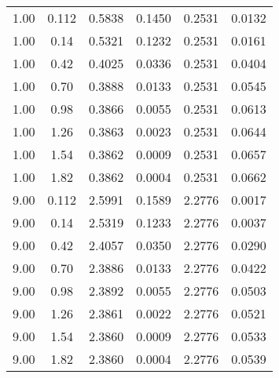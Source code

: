 \documentclass{article}[11pt]
\begin{document}
\begin{table}[h]
\begin{tabular}{cc|cccc}
1.00 & 0.112 & 0.5838 & 0.1450 & 0.2531 & 0.0132 \\
1.00 & 0.14 & 0.5321 & 0.1232 & 0.2531 & 0.0161 \\
1.00 & 0.42 & 0.4025 & 0.0336 & 0.2531 & 0.0404 \\
1.00 & 0.70 & 0.3888 & 0.0133 & 0.2531 & 0.0545 \\
1.00 & 0.98 & 0.3866 & 0.0055 & 0.2531 & 0.0613 \\
1.00 & 1.26 & 0.3863 & 0.0023 & 0.2531 & 0.0644 \\
1.00 & 1.54 & 0.3862 & 0.0009 & 0.2531 & 0.0657 \\
1.00 & 1.82 & 0.3862 & 0.0004 & 0.2531 & 0.0662 \\
9.00 & 0.112 & 2.5991 & 0.1589 & 2.2776 & 0.0017 \\
9.00 & 0.14 & 2.5319 & 0.1233 & 2.2776 & 0.0037 \\
9.00 & 0.42 & 2.4057 & 0.0350 & 2.2776 & 0.0290 \\
9.00 & 0.70 & 2.3886 & 0.0133 & 2.2776 & 0.0422 \\
9.00 & 0.98 & 2.3892 & 0.0055 & 2.2776 & 0.0503 \\
9.00 & 1.26 & 2.3861 & 0.0022 & 2.2776 & 0.0521 \\
9.00 & 1.54 & 2.3860 & 0.0009 & 2.2776 & 0.0533 \\
9.00 & 1.82 & 2.3860 & 0.0004 & 2.2776 & 0.0539 \\ \toprule
\end{tabular}
\label{tab:captab-sky130-m1}
\end{table}
\end{document}
